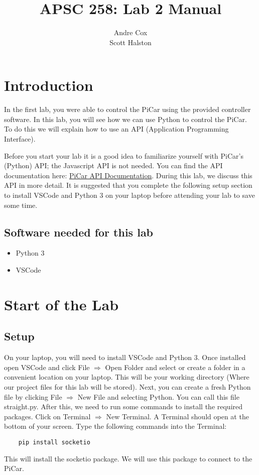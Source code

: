 \documentclass[11pt]{report}
\title{APSC 258: Lab 2 Manual}
\author{Andre Cox \\ Scott Halston}
\begin{document}
\maketitle
\tableofcontents

\clearpage

\chapter{Introduction}
In the first lab, you were able to control the PiCar using the provided controller software. In this lab, you will see how we can use Python to control the PiCar. To do this we will explain how to use an API (Application Programming Interface).


Before you start your lab it is a good idea to familiarize yourself with PiCar's (Python) API; the Javascript API is not needed. You can find the API documentation here:
\href{https://github.com/PiCarV/Car-Software/wiki/Pi-Car-V-API-Documentation}{PiCar
    API Documentation}. During this lab, we discuss this API in more detail. It is suggested that you complete the following setup section to install VSCode and Python 3 on your laptop before attending your lab to save some time.

\section{Software needed for this lab}
\begin{itemize}
    \item Python 3
    \item VSCode   
\end{itemize}

\chapter{Start of the Lab}
\section{Setup}
On your laptop, you will need to install VSCode and Python 3. Once installed open VSCode and click File $\Rightarrow$ Open Folder and select or create a folder in a convenient location on your laptop. This will be your working directory (Where our project files for this lab will be stored). Next, you can create a fresh Python file by clicking File $\Rightarrow$ New File and selecting Python. You can call this file straight.py. After this, we need to run some commands to install the required packages. Click on Terminal $\Rightarrow$ New Terminal. A Terminal should open at the bottom of your screen. Type the following commands into the Terminal:
\begin{verbatim}
    pip install socketio 
    \end{verbatim}
This will install the socketio package. We will use this package to connect to the PiCar.
\end{document}
